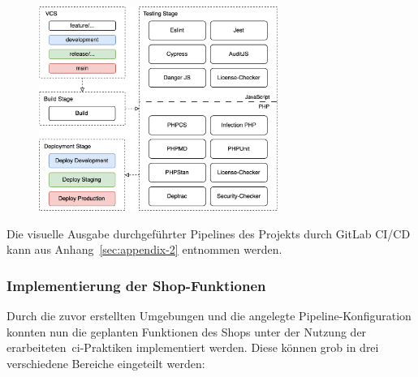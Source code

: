 \begin{figure}[H]
    \centering
    \includegraphics[width=0.69420\textwidth]{images/content/ci-pipeline-concept}
    \label{fig:ci-pipeline-concept}
\end{figure}

Die visuelle Ausgabe durchgeführter Pipelines des Projekts durch GitLab CI/CD kann aus Anhang\ \ref{sec:appendix-2}
entnommen werden.

\subsubsection{Implementierung der Shop-Funktionen}

Durch die zuvor erstellten Umgebungen und die angelegte Pipeline-Konfiguration konnten nun die geplanten Funktionen des
Shops unter der Nutzung der erarbeiteten\ \acrshort{ci}-Praktiken implementiert werden.
Diese können grob in drei verschiedene Bereiche eingeteilt werden:

